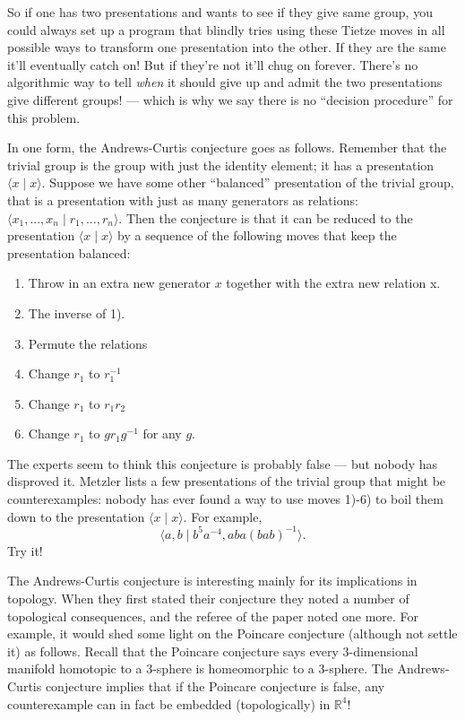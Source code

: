 \documentclass{article}
\def\tightlist{}
\begin{document}
So if one has two presentations and wants to see if they give same
group, you could always set up a program that blindly tries using these
Tietze moves in all possible ways to transform one presentation into the
other. If they are the same it'll eventually catch on! But if they're
not it'll chug on forever. There's no algorithmic way to tell
\emph{when} it should give up and admit the two presentations give
different groups! --- which is why we say there is no ``decision
procedure'' for this problem.

In one form, the Andrews-Curtis conjecture goes as follows. Remember
that the trivial group is the group with just the identity element; it
has a presentation \(\langle x \mid x \rangle\). Suppose we have some
other ``balanced'' presentation of the trivial group, that is a
presentation with just as many generators as relations:
\(\langle x_1,...,x_n \mid r_1,...,r_n \rangle\). Then the conjecture is
that it can be reduced to the presentation \(\langle x \mid x \rangle\)
by a sequence of the following moves that keep the presentation
balanced:

\begin{enumerate}
\def\labelenumi{\arabic{enumi})}
\tightlist
\item
  Throw in an extra new generator \(x\) together with the extra new
  relation x.
\item
  The inverse of 1).
\item
  Permute the relations
\item
  Change \(r_1\) to \(r_1^{-1}\)
\item
  Change \(r_1\) to \(r_1r_2\)
\item
  Change \(r_1\) to \(gr_1g^{-1}\) for any \(g\).
\end{enumerate}

The experts seem to think this conjecture is probably false --- but
nobody has disproved it. Metzler lists a few presentations of the
trivial group that might be counterexamples: nobody has ever found a way
to use moves 1)-6) to boil them down to the presentation
\(\langle x \mid x \rangle\). For example,
\[\langle a, b \mid b^5a^{-4}, aba(bab)^{-1}\rangle.\] Try it!

The Andrews-Curtis conjecture is interesting mainly for its implications
in topology. When they first stated their conjecture they noted a number
of topological consequences, and the referee of the paper noted one
more. For example, it would shed some light on the Poincare conjecture
(although not settle it) as follows. Recall that the Poincare conjecture
says every 3-dimensional manifold homotopic to a 3-sphere is
homeomorphic to a 3-sphere. The Andrews-Curtis conjecture implies that
if the Poincare conjecture is false, any counterexample can in fact be
embedded (topologically) in \(\mathbb{R}^4\)!
\end{document}
